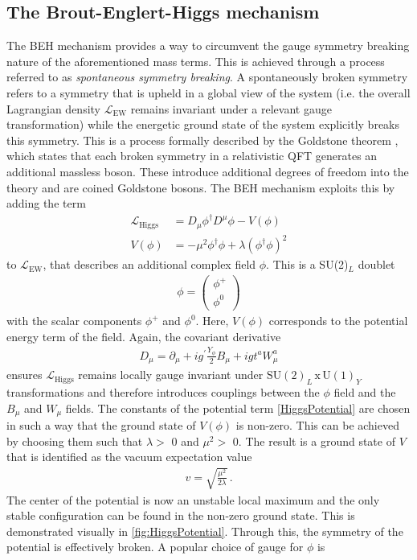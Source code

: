 \subsection{The Brout-Englert-Higgs mechanism}
The BEH mechanism provides a way to circumvent the gauge symmetry breaking nature of the aforementioned mass terms. This is achieved through a process referred to as \textit{spontaneous symmetry breaking}. A spontaneously broken symmetry refers to a symmetry that is upheld in a global view of the system (i.e. the overall Lagrangian density $\mathcal{L}_{\mathrm{EW}}$ remains invariant under a relevant gauge transformation) while the energetic ground state of the system explicitly breaks this symmetry. This is a process formally described by the Goldstone theorem \cite{Goldstone}, which states that each broken symmetry in a relativistic QFT generates an additional massless boson. These introduce additional degrees of freedom into the theory and are coined Goldstone bosons. The BEH mechanism exploits this by adding the term
\begin{align}
        \mathcal{L}_{\mathrm{Higgs}} &= D_{\mu} \phi^{\dagger} D^{\mu} \phi - V(\phi) \label{HiggsTerm} \\
        V(\phi) &= - \mu^{2}\phi^{\dagger} \phi + \lambda(\phi^{\dagger}\phi)^2 \label{HiggsPotential} 
\end{align}
to $\mathcal{L}_{\mathrm{EW}}$, that describes an additional complex field $\phi$. This is a SU(2)$_{L}$ doublet 
\begin{align}
    \phi= \begin{pmatrix}
        \phi^{+} \\
        \phi^{0}
        \end{pmatrix} 
\end{align}
with the scalar components $\phi^{+}$ and  $\phi^{0}$. Here, $V(\phi)$ corresponds to the potential energy term of the field. Again, the covariant derivative 
\begin{align}
    D_{\mu} = \partial_{\mu}+ig^{\prime}\frac{Y_{\phi}}{2}B_{\mu}+igt^{a}W_{\mu}^{a}
\end{align}
ensures $\mathcal{L}_{\mathrm{Higgs}}$ remains locally gauge invariant under $\mathrm{SU}(2)_L \, \mathrm{x} \, \mathrm{U}(1)_{Y}$ transformations and therefore introduces couplings between the $\phi$ field and the $B_{\mu}$ and $W_{\mu}$ fields. The constants of the potential term \autoref{HiggsPotential} are chosen in such a way that the ground state of $V(\phi)$ is non-zero. This can be achieved by choosing them such that $\lambda >$ 0 and $\mu^{2} >$ 0. The result is a ground state of $V$ that is identified as the vacuum expectation value 
\begin{align}
    v=\sqrt{\frac{\mu^{2}}{2\lambda}} \, .
\end{align}
The center of the potential is now an unstable local maximum and the only stable configuration can be found in the non-zero ground state. This is demonstrated visually in \autoref{fig:HiggsPotential}. Through this, the symmetry of the potential is effectively broken. A popular choice of gauge for $\phi$ is 

